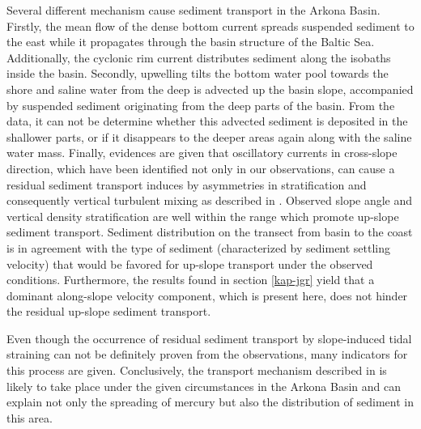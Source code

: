 Several different mechanism cause sediment transport in the Arkona Basin. 
Firstly, the mean flow of 
the dense bottom current spreads suspended sediment to the east while it 
propagates through the basin structure of the Baltic Sea. Additionally, the 
cyclonic rim current distributes sediment along the isobaths inside the basin. 
Secondly, upwelling tilts the bottom water pool towards the shore and saline 
water from the deep is advected up the basin slope, accompanied by 
suspended sediment originating from the deep parts of the basin. From the data, 
it can not be determine whether this advected sediment is deposited in the 
shallower parts, or if it disappears to the deeper areas again along with the 
saline water mass. Finally, evidences are given that oscillatory currents 
in cross-slope direction, which have been identified not only in our 
observations, can cause a residual sediment transport induces by asymmetries in 
stratification and consequently vertical turbulent mixing as described in 
\cite{schulzumlauf2016}. Observed slope angle and vertical density 
stratification are well within the range which promote up-slope sediment 
transport. Sediment distribution on the transect from basin to the coast is in 
agreement with the type of sediment (characterized by sediment settling 
velocity) that would be favored for up-slope transport under the observed 
conditions. Furthermore, the results found in section \ref{kap-jgr} yield that 
a dominant along-slope velocity component, which is present here, does not 
hinder the residual up-slope sediment transport.

Even though the occurrence of residual sediment transport by slope-induced tidal 
straining can not be definitely proven from the observations, many indicators 
for this process are given. Conclusively, the transport 
mechanism described in \cite{schulzumlauf2016} is likely to take place under 
the given circumstances in the Arkona Basin and can explain not only the 
spreading of mercury but also the distribution of sediment in this area.